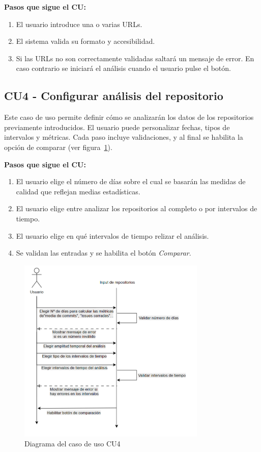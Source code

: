 \textbf{Pasos que sigue el CU:}
\begin{enumerate}
  \item El usuario introduce una o varias URLs.
  \item El sistema valida su formato y accesibilidad.
  \item Si las URLs no son correctamente validadas saltará un mensaje de error. En caso contrario se iniciará el análisis cuando el usuario pulse el botón.
\end{enumerate}

\subsection*{CU4 - Configurar análisis del repositorio}

Este caso de uso permite definir cómo se analizarán los datos de los repositorios previamente introducidos. El usuario puede personalizar fechas, tipos de intervalos y métricas. Cada paso incluye validaciones, y al final se habilita la opción de comparar (ver figura~\ref{fig:DiagramaCU4}).

\textbf{Pasos que sigue el CU:}
\begin{enumerate}
  \item El usuario elige el número de días sobre el cual se basarán las medidas de calidad que reflejan medias estadísticas.
  \item El usuario elige entre analizar los repositorios al completo o por intervalos de tiempo.
  \item El usuario elige en qué intervalos de tiempo relizar el análisis.
  \item Se validan las entradas y se habilita el botón \textit{Comparar}.
\end{enumerate}

\begin{figure}[H]
\centering
\includegraphics[width=0.8\textwidth]{img/DiagramaCU4.png}
\caption{Diagrama del caso de uso CU4}
\label{fig:DiagramaCU4}
\end{figure}

